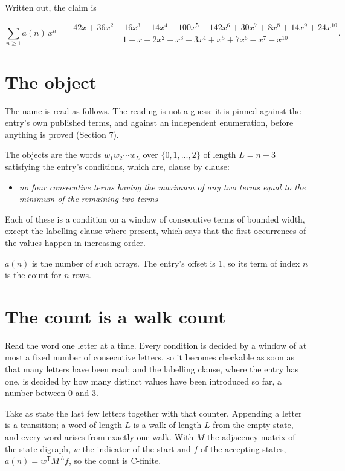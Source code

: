 \documentclass[11pt]{article}
\theoremstyle{definition}
\begin{document}
Written out, the claim is

\[\sum_{n \ge 1} a(n)\,x^n \;=\; \frac{42x + 36x^{2} - 16x^{3} + 14x^{4} - 100x^{5} - 142x^{6} + 30x^{7} + 8x^{8} + 14x^{9} + 24x^{10}}{1 - x - 2x^{2} + x^{3} - 3x^{4} + x^{5} + 7x^{6} - x^{7} - x^{10}}.\]

\section{The object}

The name is read as follows. The reading is not a guess: it is pinned against the entry's own published terms, and against an independent enumeration, before anything is proved (Section 7).

The objects are the words $w_1 w_2 \cdots w_L$ over $\{0,1,\dots,2\}$ of length $L = n + 3$ satisfying the entry's conditions, which are, clause by clause:

\begin{itemize}

\item {\itshape no four consecutive terms having the maximum of any two terms equal to the minimum of the remaining two terms}

\end{itemize}

Each of these is a condition on a window of consecutive terms of bounded width, except the labelling clause where present, which says that the first occurrences of the values happen in increasing order.

$a(n)$ is the number of such arrays. The entry's offset is 1, so its term of index $n$ is the count for $n$ rows.

\section{The count is a walk count}

Read the word one letter at a time. Every condition is decided by a window of at most a fixed number of consecutive letters, so it becomes checkable as soon as that many letters have been read; and the labelling clause, where the entry has one, is decided by how many distinct values have been introduced so far, a number between $0$ and 3.

Take as state the last few letters together with that counter. Appending a letter is a transition; a word of length $L$ is a walk of length $L$ from the empty state, and every word arises from exactly one walk. With $M$ the adjacency matrix of the state digraph, $w$ the indicator of the start and $f$ of the accepting states, $a(n) = w^{\mathsf T}M^{\,L}f$, so the count is C-finite.
\end{document}
